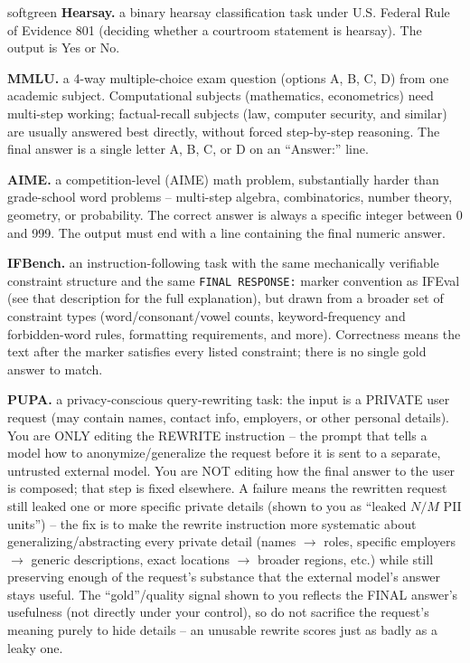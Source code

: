 \documentclass[10pt]{article} %
\begin{document}
\begin{promptbox}[title={\textbf{Task descriptions inserted into the system prompt}},fontupper=\small]{softgreen}
\textbf{Hearsay.} a binary hearsay classification task under U.S. Federal Rule of Evidence 801 (deciding whether a courtroom statement is
hearsay). The output is Yes or No.\par
\textbf{MMLU.} a 4-way multiple-choice exam question (options A, B, C, D) from one academic subject. Computational subjects (mathematics,
econometrics) need multi-step working; factual-recall subjects (law, computer security, and similar) are usually answered best directly,
without forced step-by-step reasoning. The final answer is a single letter A, B, C, or D on an ``Answer:'' line.\par
\textbf{AIME.} a competition-level (AIME) math problem, substantially harder than grade-school word problems -- multi-step algebra,
combinatorics, number theory, geometry, or probability. The correct answer is always a specific integer between 0 and 999. The output
must end with a line containing the final numeric answer.\par
\textbf{IFBench.} an instruction-following task with the same mechanically verifiable constraint structure and the same
\texttt{FINAL RESPONSE:} marker convention as IFEval (see that description for the full explanation), but drawn from a broader set of constraint types (word/consonant/vowel counts,
keyword-frequency and forbidden-word rules, formatting requirements, and more). Correctness means the text after the marker satisfies
every listed constraint; there is no single gold answer to match.\par
\textbf{PUPA.} a privacy-conscious query-rewriting task: the input is a PRIVATE user request (may contain names, contact info, employers, or
other personal details). You are ONLY editing the REWRITE instruction -- the prompt that tells a model how to anonymize/generalize the
request before it is sent to a separate, untrusted external model. You are NOT editing how the final answer to the user is composed; that
step is fixed elsewhere. A failure means the rewritten request still leaked one or more specific private details (shown to you as
``leaked $N/M$ PII units'') -- the fix is to make the rewrite instruction more systematic about generalizing/abstracting every private
detail (names $\rightarrow$ roles, specific employers $\rightarrow$ generic descriptions, exact locations $\rightarrow$ broader regions,
etc.) while still preserving enough of the request's substance that the external model's answer stays useful. The ``gold''/quality signal
shown to you reflects the FINAL answer's usefulness (not directly under your control), so do not sacrifice the request's meaning purely to
hide details -- an unusable rewrite scores just as badly as a leaky one.
\end{promptbox}
\end{document}
